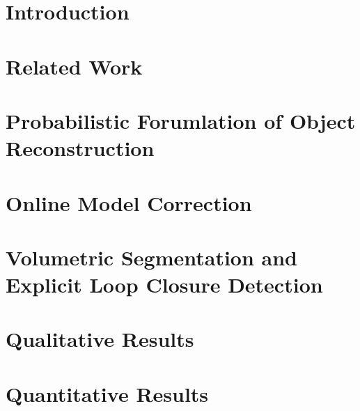 
\section{Introduction}

\section{Related Work}

\section{Probabilistic Forumlation of Object Reconstruction}

\section{Online Model Correction}

\section{Volumetric Segmentation and Explicit Loop Closure Detection}

\section{Qualitative Results}

\section{Quantitative Results}